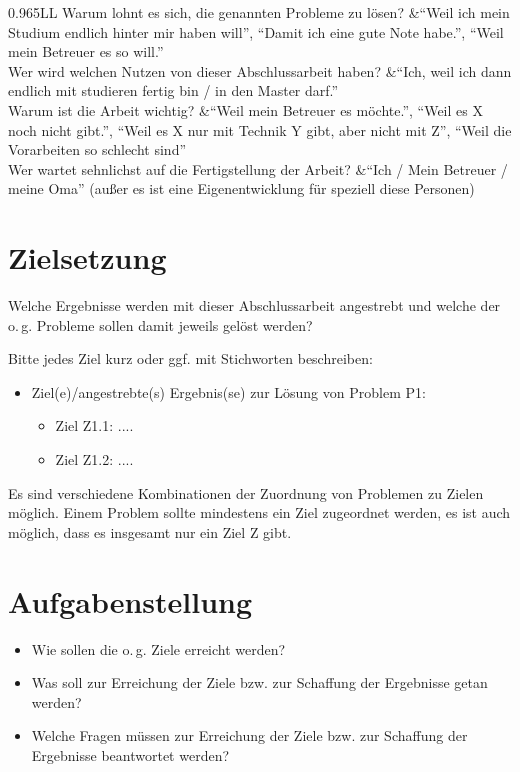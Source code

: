 \begin{temp}
\begin{tabulary}{0.965\textwidth}{LL}
Warum lohnt es sich, die genannten Probleme zu lösen?				&\enquote{Weil ich mein Studium endlich hinter mir haben will}, \enquote{Damit ich eine gute Note habe.}, \enquote{Weil mein Betreuer es so will.}\\
Wer wird welchen Nutzen von dieser Abschlussarbeit haben?		&\enquote{Ich, weil ich dann endlich mit studieren fertig bin / in den Master darf.}\\
Warum ist die Arbeit wichtig?																&\enquote{Weil mein Betreuer es möchte.}, \enquote{Weil es X noch nicht gibt.}, \enquote{Weil es X nur mit Technik Y gibt, aber nicht mit Z}, \enquote{Weil die Vorarbeiten so schlecht sind}\\
Wer wartet sehnlichst auf die Fertigstellung der Arbeit?		&\enquote{Ich / Mein Betreuer / meine Oma} (außer es ist eine Eigenentwicklung für speziell diese Personen)\\
\end{tabulary}

\section{Zielsetzung}\label{sec:zielsetzung}

Welche Ergebnisse werden mit dieser Abschlussarbeit angestrebt und welche der o.\,g. Probleme sollen damit jeweils gelöst werden?

Bitte jedes Ziel kurz oder ggf. mit Stichworten beschreiben:
\begin{itemize}
\item Ziel(e)/angestrebte(s) Ergebnis(se) zur Lösung von Problem P1:
	\begin{itemize}
	\item Ziel Z1.1: ....
	\item Ziel Z1.2: ....
	\end{itemize}
\end{itemize}

Es sind verschiedene Kombinationen der Zuordnung von Problemen zu Zielen möglich.
Einem Problem sollte mindestens ein Ziel zugeordnet werden, es ist auch möglich, dass es insgesamt nur ein Ziel Z gibt.

\section{Aufgabenstellung}

\begin{itemize}
\item Wie sollen die o.\,g. Ziele erreicht werden?
\item Was soll zur Erreichung der Ziele bzw. zur Schaffung der Ergebnisse getan werden?
\item Welche Fragen müssen zur Erreichung der Ziele bzw. zur Schaffung der Ergebnisse beantwortet  werden?
\end{itemize}


\end{temp}
